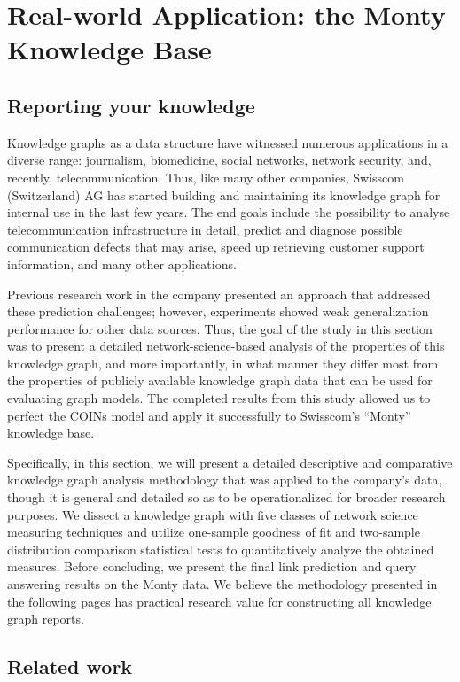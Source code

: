 \section{Real-world Application: the Monty Knowledge Base}
\label{sec: swisscom}

\subsection{Reporting your knowledge}

Knowledge graphs as a data structure have witnessed numerous applications in a diverse range: journalism, biomedicine, social networks, network security, and, recently, telecommunication. Thus, like many other companies, Swisscom (Switzerland) AG has started building and maintaining its knowledge graph for internal use in the last few years. The end goals include the possibility to analyse telecommunication infrastructure in detail, predict and diagnose possible communication defects that may arise, speed up retrieving customer support information, and many other applications.

Previous research work in the company presented an approach that addressed these prediction challenges; however, experiments showed weak generalization performance for other data sources. Thus, the goal of the study in this section was to present a detailed network-science-based analysis of the properties of this knowledge graph, and more importantly, in what manner they differ most from the properties of publicly available knowledge graph data that can be used for evaluating graph models. The completed results from this study allowed us to perfect the COINs model and apply it successfully to Swisscom's \enquote{Monty} knowledge base. 

Specifically, in this section, we will present a detailed descriptive and comparative knowledge graph analysis methodology that was applied to the company's data, though it is general and detailed so as to be operationalized for broader research purposes. We dissect a knowledge graph with five classes of network science measuring techniques and utilize one-sample goodness of fit and two-sample distribution comparison statistical tests to quantitatively analyze the obtained measures. Before concluding, we present the final link prediction and query answering results on the Monty data. We believe the methodology presented in the following pages has practical research value for constructing all knowledge graph reports. 

\subsection{Related work}
\label{sec:related_work}

